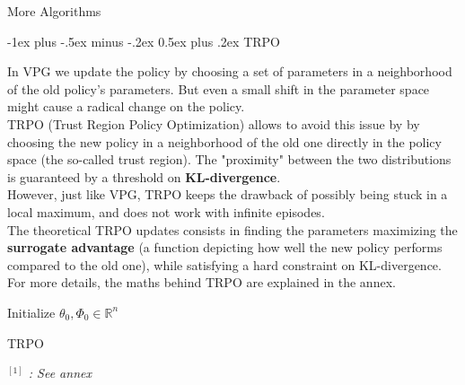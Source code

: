 \documentclass[10pt,landscape]{article}
\makeatletter
\renewcommand{\section}{\@startsection{section}{1}{0mm}%
                                {-1ex plus -.5ex minus -.2ex}%
                                {0.5ex plus .2ex}%
                                {\normalfont\large\bfseries}}
\makeatother
\begin{document}
\begin{multicols}{3}

\begin{center}
     \Large{More Algorithms} \\
\end{center}



\section{TRPO}

In VPG we update the policy by choosing a set of parameters in a neighborhood of the old policy's parameters. But even a small shift in the parameter space might cause a radical change on the policy.\\
TRPO (Trust Region Policy Optimization) allows to avoid this issue by by choosing the new policy in a neighborhood of the old one directly in the policy space (the so-called trust region). The "proximity" between the two distributions is guaranteed by a threshold on \textbf{KL-divergence}.\\
However, just like VPG, TRPO keeps the drawback of possibly being stuck in a local maximum, and does not work with infinite episodes.\\
The theoretical TRPO updates consists in finding the parameters maximizing the \textbf{surrogate advantage} (a function depicting how well the new policy performs compared to the old one), while satisfying a hard constraint on KL-divergence. For more details, the maths behind TRPO are explained in the annex.
\medskip


\begin{algorithm}[H]
 Initialize $\theta_0, \Phi_0 \in \mathbb{R}^n$\\
\caption{TRPO}
\end{algorithm}
\begingroup
    \fontsize{5pt}{8pt}
        \textit{$^{[1]}$ : See annex}
\endgroup



\end{multicols}
\end{document}
